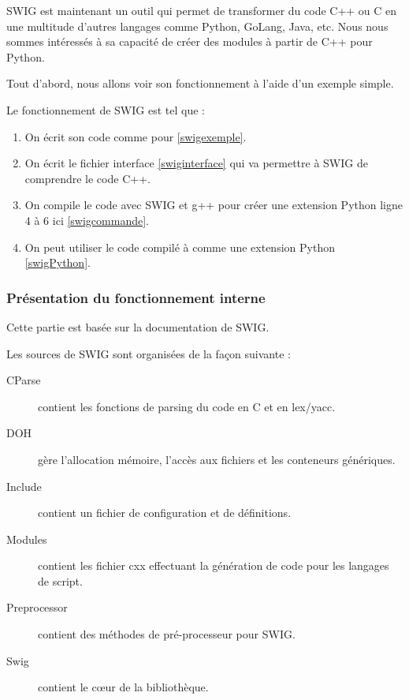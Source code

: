 \documentclass[11pt, french, screen]{report-rd-info}
\begin{document}
SWIG est maintenant un outil qui permet de transformer du code C++ ou C en une multitude d'autres langages comme Python, GoLang, Java, etc. Nous nous sommes intéressés à sa capacité de créer des modules à partir de C++ pour Python.

Tout d'abord, nous allons voir son fonctionnement à l'aide d'un exemple simple.








Le fonctionnement de SWIG est tel que :
\begin{enumerate}
\item On écrit son code comme pour \ref{swigexemple}.
\item On écrit le fichier interface \ref{swiginterface} qui va permettre à SWIG de comprendre le code C++.
\item On compile le code avec SWIG et g++ pour créer une extension Python ligne 4 à 6 ici \ref{swigcommande}.
\item On peut utiliser le code compilé à comme une extension Python \ref{swigPython}.
\end{enumerate}

\subsubsection{Présentation du fonctionnement interne}

Cette partie est basée sur la documentation de SWIG\cite{swigmaindoc}.

Les sources de SWIG sont organisées de la façon suivante :

\begin{description}
\item[CParse] contient les fonctions de parsing du code en C et en lex/yacc.

\item[DOH] gère l'allocation mémoire, l'accès aux fichiers et les conteneurs génériques.

\item[Include] contient un fichier de configuration et de définitions.

\item[Modules] contient les fichier cxx effectuant la génération de code pour les langages de script.

\item[Preprocessor] contient des méthodes de pré-processeur pour SWIG.

\item[Swig] contient le c\oe ur de la bibliothèque. 
\end{description}
\end{document}
